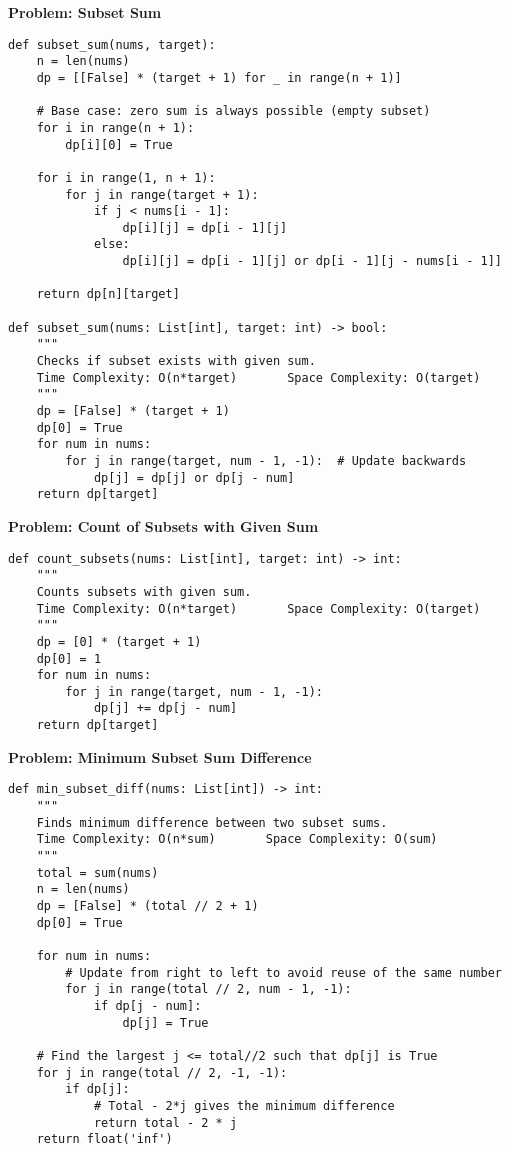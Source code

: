 \noindent\textbf{Problem: Subset Sum}
\begin{verbatim}
def subset_sum(nums, target):
    n = len(nums)
    dp = [[False] * (target + 1) for _ in range(n + 1)]
    
    # Base case: zero sum is always possible (empty subset)
    for i in range(n + 1):
        dp[i][0] = True

    for i in range(1, n + 1):
        for j in range(target + 1):
            if j < nums[i - 1]:
                dp[i][j] = dp[i - 1][j]
            else:
                dp[i][j] = dp[i - 1][j] or dp[i - 1][j - nums[i - 1]]

    return dp[n][target]

def subset_sum(nums: List[int], target: int) -> bool:
    """
    Checks if subset exists with given sum.
    Time Complexity: O(n*target)       Space Complexity: O(target)
    """
    dp = [False] * (target + 1)
    dp[0] = True
    for num in nums:
        for j in range(target, num - 1, -1):  # Update backwards
            dp[j] = dp[j] or dp[j - num]
    return dp[target]
\end{verbatim}

\noindent\textbf{Problem: Count of Subsets with Given Sum}
\begin{verbatim}
def count_subsets(nums: List[int], target: int) -> int:
    """
    Counts subsets with given sum.
    Time Complexity: O(n*target)       Space Complexity: O(target)
    """
    dp = [0] * (target + 1)
    dp[0] = 1
    for num in nums:
        for j in range(target, num - 1, -1):
            dp[j] += dp[j - num]
    return dp[target]
\end{verbatim}

\noindent\textbf{Problem: Minimum Subset Sum Difference}
\begin{verbatim}
def min_subset_diff(nums: List[int]) -> int:
    """
    Finds minimum difference between two subset sums.
    Time Complexity: O(n*sum)       Space Complexity: O(sum)
    """
    total = sum(nums)
    n = len(nums)
    dp = [False] * (total // 2 + 1)
    dp[0] = True
    
    for num in nums:
        # Update from right to left to avoid reuse of the same number
        for j in range(total // 2, num - 1, -1):
            if dp[j - num]:
                dp[j] = True

    # Find the largest j <= total//2 such that dp[j] is True
    for j in range(total // 2, -1, -1):
        if dp[j]:
            # Total - 2*j gives the minimum difference
            return total - 2 * j
    return float('inf')
\end{verbatim}

